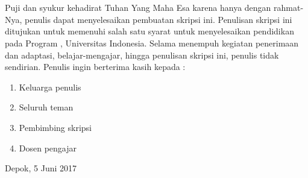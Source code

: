 \chapter*{\kataPengantar}
Puji dan syukur kehadirat Tuhan Yang Maha Esa karena hanya dengan rahmat-Nya, penulis dapat menyelesaikan pembuatan skripsi ini. Penulisan skripsi ini ditujukan untuk memenuhi salah satu syarat untuk menyelesaikan pendidikan pada Program \gelar, Universitas Indonesia. Selama menempuh kegiatan penerimaan dan adaptasi, belajar-mengajar, hingga penulisan skripsi ini, penulis tidak sendirian. Penulis ingin berterima kasih kepada :
\begin{enumerate}
  \item Keluarga penulis
  \item Seluruh teman
  \item Pembimbing skripsi
  \item Dosen pengajar
\end{enumerate}

\vspace*{0.1cm}
\begin{flushright}
Depok, 5 Juni 2017\\[0.1cm]
\vspace*{1cm}
\penulis

\end{flushright}

